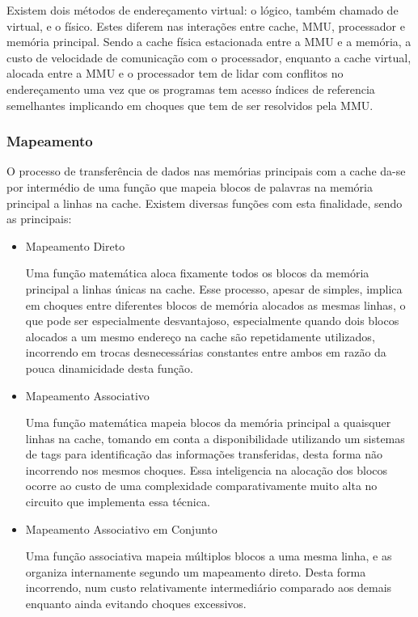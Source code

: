 \documentclass[12pt]{article}
\begin{document}
Existem dois métodos de endereçamento virtual: o lógico, também chamado de virtual, e o físico. Estes diferem nas interações entre cache, MMU, processador e memória principal. Sendo a cache física estacionada entre a MMU e a memória, a custo de velocidade de comunicação com o processador, enquanto a cache virtual, alocada entre a MMU e o processador tem de lidar com conflitos no endereçamento uma vez que os programas tem acesso índices de referencia semelhantes implicando em choques que tem de ser resolvidos pela MMU.
\subsubsection*{Mapeamento}
O processo de transferência de dados nas memórias principais com a cache da-se por intermédio de uma função que mapeia blocos de palavras na memória principal a linhas na cache. Existem diversas funções com esta finalidade, sendo as principais:

\begin{itemize}
\item Mapeamento Direto

Uma função matemática aloca fixamente todos os blocos da memória principal a linhas únicas na cache. Esse processo, apesar de simples, implica em choques entre diferentes blocos de memória alocados as mesmas linhas, o que pode ser especialmente desvantajoso, especialmente quando dois blocos alocados a um mesmo endereço na cache são repetidamente utilizados, incorrendo em trocas desnecessárias constantes entre ambos em razão da pouca dinamicidade desta função.

\item Mapeamento Associativo

Uma função matemática mapeia blocos da memória principal a quaisquer linhas na cache, tomando em conta a disponibilidade utilizando um sistemas de tags para identificação das informações transferidas, desta forma não incorrendo nos mesmos choques. Essa inteligencia na alocação dos blocos ocorre ao custo de uma complexidade comparativamente muito alta no circuito que implementa essa técnica.

\item Mapeamento Associativo em Conjunto

Uma função associativa mapeia múltiplos blocos a uma mesma linha, e as organiza internamente segundo um mapeamento direto. Desta forma incorrendo, num custo relativamente intermediário comparado aos demais enquanto ainda evitando choques excessivos.
\end{itemize}
\end{document}
